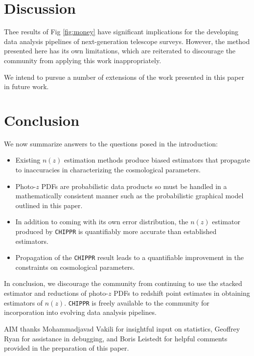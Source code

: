 \documentclass[iop]{emulateapj}
\newcommand{\chippr}{\texttt{CHIPPR} }
\begin{document}
\section{Discussion}
\label{sec:discussion}

Thee results of Fig \ref{fig:money} have significant implications for the 
developing data analysis pipelines of next-generation telescope surveys.  
However, the method presented here has its own limitations, which are 
reiterated to discourage the community from applying this work inappropriately.

We intend to pursue a number of extensions of the work presented in this paper 
in future work.

\section{Conclusion}
\label{sec:conclusion}

We now summarize answers to the questions posed in the introduction:

\begin{itemize}
	\item Existing $n(z)$ estimation methods produce biased estimators that 
propagate to inaccuracies in characterizing the cosmological parameters.
	\item Photo-$z$ PDFs are probabilistic data products so must be handled 
in a mathematically consistent manner such as the probabilistic graphical model 
outlined in this paper.
	\item In addition to coming with its own error distribution, the $n(z)$ 
estimator produced by \chippr is quantifiably more accurate than established 
estimators.
	\item Propagation of the \chippr result leads to a quantifiable 
improvement in the constraints on cosmological parameters.
\end{itemize}

In conclusion, we discourage the community from continuing to use the stacked 
estimator and reductions of photo-$z$ PDFs to redshift point estimates in 
obtaining estimators of $n(z)$.  \chippr is freely available to the community 
for incorporation into evolving data analysis pipelines.  



\begin{acknowledgements}
AIM thanks Mohammadjavad Vakili for insightful input on statistics, Geoffrey 
Ryan for assistance in debugging, and Boris Leistedt for helpful comments 
provided in the preparation of this paper.
\end{acknowledgements}
\end{document}
